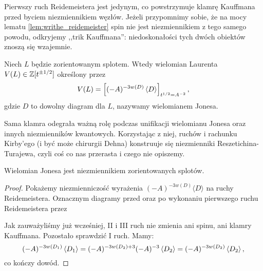 Pierwszy ruch Reidemeistera jest jedynym, co powstrzymuje klamrę Kauffmana przed byciem niezmiennikiem węzłów.
Jeżeli przypomnimy sobie, że na mocy lematu \ref{lem:writhe_reidemeister} spin nie jest niezmiennikiem z tego samego powodu, odkryjemy ,,trik Kauffmana'': niedoskonałości tych dwóch obiektów znoszą się wzajemnie.
%
%

\begin{definition}
\label{def:jones_polynomial}%
    Niech $L$ będzie zorientowanym splotem.
    Wtedy wielomian Laurenta $V(L) \in \mathbb Z[t^{\pm 1/2}]$ określony przez
    \begin{equation}
        V(L)=\left[(-A)^{-3w(D)} \left\langle{D}\right\rangle\right]_{t^{1/2}=A^{-2}},
    \end{equation}
    gdzie $D$ to dowolny diagram dla $L$, nazywamy wielomianem Jonesa.
\end{definition}

Sama klamra odegrała ważną rolę podczas unifikacji wielomianu Jonesa oraz innych niezmienników kwantowych.
Korzystając z niej, ruchów i rachunku Kirby'ego (i być może chirurgii Dehna) konstruuje się niezmienniki Reszetichina-Turajewa, czyli coś co nas przerasta i czego nie opiszemy.
%
%
%
%
%
%

\begin{proposition}
    Wielomian Jonesa jest niezmiennikiem zorientowanych splotów.
\end{proposition}

\begin{proof}
    Pokażemy niezmienniczość wyrażenia $(-A)^{-3w(D)}\langle D\rangle$ na ruchy Reidemeistera.
    Oznacznym diagramy przed oraz po wykonaniu pierwszego ruchu Reidemeistera przez
\begin{comment}
    \begin{equation}
        D_1 := \LargeReidemeisterOneLeft,
        \quad\quad\quad
        D_2 := \LargeReidemeisterOneStraight.
    \end{equation}
\end{comment}
    Jak zauważyliśmy już wcześniej, II i III ruch nie zmienia ani spinu, ani klamry Kauffmana.
    Pozostało sprawdzić I ruch.
    Mamy:
    \begin{equation}
        (-A)^{-3 w\left(D_1\right)} \left\langle{D_1}\right\rangle =
        (-A)^{-3 w\left(D_2\right) + 3} (-A)^{-3}\left\langle{D_2}\right\rangle =
        (-A)^{-3 w\left(D_2\right)} \left\langle{D_2}\right\rangle,
    \end{equation}
    co kończy dowód.
\end{proof}

